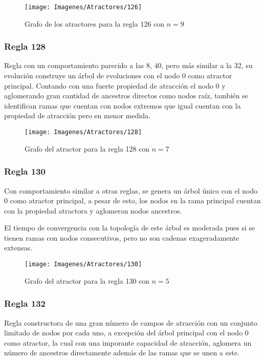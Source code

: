 \documentclass[]{article}
\begin{document}
				\hfill\break
				\hfill\break
				\begin{figure}[!h]
					\centering
					\texttt{[image: Imagenes/Atractores/126]}
					\caption{Grafo de los atractores para la regla 126 con $n=9$}
					\label{Regla_126}
				\end{figure}
			
			\newpage
			\subsubsection{Regla 128}
				\justifying
				Regla con un comportamiento parecido a las 8, 40, pero más similar a la 32, su evolución construye un árbol de evoluciones con el nodo 0 como atractor principal. Contando con una fuerte propiedad de atracción el nodo 0 y aglomerando gran cantidad de ancestros directos como nodos raíz, también se identifican ramas que cuentan con nodos extremos que igual cuentan con la propiedad de atracción pero en menor medida.
				
				\hfill\break
				\hfill\break
				\begin{figure}[!h]
					\centering
					\texttt{[image: Imagenes/Atractores/128]}
					\caption{Grafo del atractor para la regla 128 con $n=7$}
					\label{Regla_128}
				\end{figure}
			
			\newpage
			\subsubsection{Regla 130}
				\justifying
				Con comportamiento similar a otras reglas, se genera un árbol único con el nodo 0 como atractor principal, a pesar de esto, los nodos en la rama principal cuentan con la propiedad atractora y aglomeran nodos ancestros.
				
				\hfill\break
				\justifying
				El tiempo de convergencia con la topología de este árbol es moderada pues si se tienen ramas con nodos consecutivos, pero no son cadenas exageradamente extensas.
				
				\hfill\break
				\hfill\break
				\begin{figure}[!h]
					\centering
					\texttt{[image: Imagenes/Atractores/130]}
					\caption{Grafo del atractor para la regla 130 con $n=5$}
					\label{Regla_130}
				\end{figure}
			
			\newpage
			\subsubsection{Regla 132}
				\justifying
				Regla constructora de una gran número de campos de atracción con un conjunto limitado de nodos por cada uno, a excepción del árbol principal con el nodo 0 como atractor, la cual con una imporante capacidad de atracción, aglomera un número de ancestros directamente además de las ramas que se unen a este.
				
\end{document}
